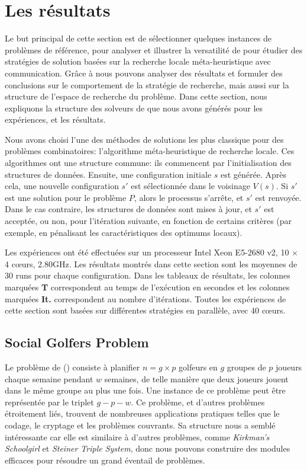 \documentclass{jfpc-preprint}
\begin{document}
\section{Les résultats}

Le but principal de cette section est de sélectionner quelques instances de problèmes de référence, pour analyser et illustrer la versatilité de \posl{} pour étudier des stratégies de solution basées sur la recherche locale méta-heuristique avec communication. Grâce à \posl{} nous pouvons analyser des résultats et formuler des conclusions sur le comportement de la stratégie de recherche, mais aussi sur la structure de l'espace de recherche du problème. Dans cette section, nous expliquons la structure des  solveurs de \posl{} que nous avons générés pour les expériences, et les résultats.

Nous avons choisi l'une des méthodes de solutions les plus classique pour des problèmes combinatoires: l'algorithme méta-heuristique de recherche locale. Ces algorithmes ont une structure commune: ils commencent par l'initialisation des structures de données. Ensuite, une configuration initiale $s$ est générée. Après cela, une nouvelle configuration $s'$ est sélectionnée dans le voisinage $V \left(s \right) $. Si $s'$ est une solution pour le problème $P$, alors le processus s'arrête, et $s'$ est renvoyée. Dans le cas contraire, les structures de données sont mises à jour, et $s'$ est acceptée, ou non, pour l'itération suivante, en fonction de certains critères (par exemple, en pénalisant les caractéristiques des optimums locaux).

Les expériences ont été effectuées sur un processeur Intel \R{} Xeon \TM{} E5-2680 v2, 10 $\times$ 4 c\oe urs, 2.80GHz. Les résultats montrés dans cette section sont les moyennes de 30 runs pour chaque configuration. Dans les tableaux de résultats, les colonnes marquées {\bf T} correspondent au temps de l'exécution en secondes et les colonnes marquées {\bf It.} correspondent au nombre d'itérations. Toutes les expériences de cette section sont basées sur différentes stratégies en parallèle, avec 40 c\oe urs.

\subsection{Social Golfers Problem}

Le problème de \sg{} (\SGP) consiste à planifier $n = g \times p$ golfeurs en $g$ groupes de $p$ joueurs chaque semaine pendant $w$ semaines, de telle manière que deux joueurs jouent dans le même groupe au plus une fois. Une instance de ce problème peut être représentée par le triplet $g-p-w$. Ce problème, et d'autres problèmes étroitement liés, trouvent de nombreuses applications pratiques telles que le codage, le cryptage et les problèmes couvrants. Sa structure nous a semblé intéressante car elle est similaire à d'autres problèmes, comme {\it Kirkman's Schoolgirl} et {\it Steiner Triple System}, donc nous pouvons construire des modules efficaces pour résoudre un grand éventail de problèmes.
\end{document}
